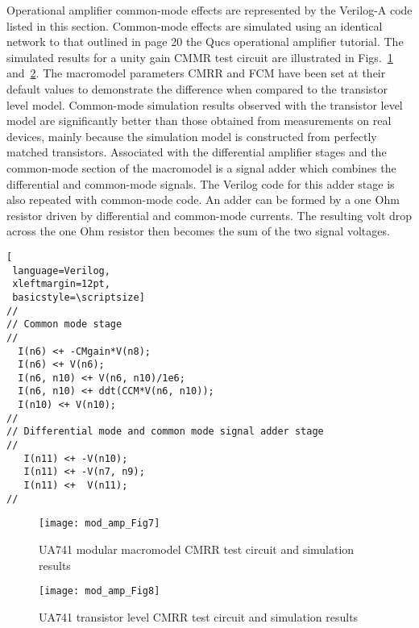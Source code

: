 Operational amplifier common-mode effects are represented by the
Verilog-A code listed in this section. Common-mode effects are
simulated using an identical network to that outlined in page 20 the
Qucs operational amplifier tutorial. The simulated results for a unity
gain CMMR test circuit are illustrated in Figs.~\ref{fig:mod_amp7}
and~\ref{fig:mod_amp8}.  The macromodel parameters CMRR and FCM have
been set at their default values to demonstrate the difference when
compared to the transistor level model. Common-mode simulation results
observed with the transistor level model are significantly better than
those obtained from measurements on real devices, mainly because the
simulation model is constructed from perfectly matched
transistors. Associated with the differential amplifier stages and the
common-mode section of the macromodel is a signal adder which combines
the differential and common-mode signals.  The Verilog code for this
adder stage is also repeated with common-mode code.  An adder can be
formed by a one Ohm resistor driven by differential and common-mode
currents. The resulting volt drop across the one Ohm resistor then
becomes the sum of the two signal voltages.


\begin{lstlisting}[
 language=Verilog, 
 xleftmargin=12pt,
 basicstyle=\scriptsize]
//
// Common mode stage
// 
  I(n6) <+ -CMgain*V(n8);
  I(n6) <+ V(n6);
  I(n6, n10) <+ V(n6, n10)/1e6;
  I(n6, n10) <+ ddt(CCM*V(n6, n10));
  I(n10) <+ V(n10);
//
// Differential mode and common mode signal adder stage
//
   I(n11) <+ -V(n10);
   I(n11) <+ -V(n7, n9);
   I(n11) <+  V(n11);
//
\end{lstlisting}

\begin{figure} [h]
  \centering
  \texttt{[image: mod\_amp\_Fig7]}
  \caption{UA741 modular macromodel CMRR test circuit and simulation results}
  \label{fig:mod_amp7}
\end{figure} 


\begin{figure} [h]
  \centering
  \texttt{[image: mod\_amp\_Fig8]}
  \caption{UA741 transistor level CMRR test circuit and simulation results}
  \label{fig:mod_amp8}
\end{figure} 



